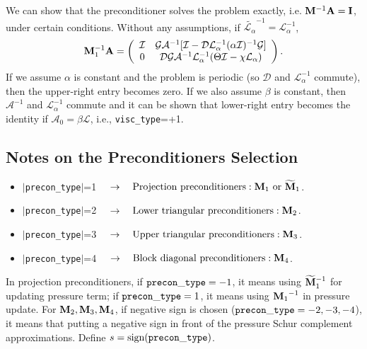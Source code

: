 \documentclass[final]{siamltex}
\def\Ab {{\bf A}}
\def\Ib {{\bf I}}
\def\Mb {{\bf M}}
\begin{document}
We can show that the preconditioner solves the problem exactly, i.e. $\Mb^{-1}\Ab = \Ib$,
under certain conditions.  Without any assumptions, if $\widetilde{\mathcal{L}_\alpha}^{-1}=\mathcal{L}_\alpha^{-1}$,
\begin{equation}
\Mb_1^{-1}\Ab =
\left(\begin{array}{cc}
\mathcal{I} & \mathcal{G}\mathcal{A}^{-1}[\mathcal{I}-\mathcal{D}\mathcal{L}_\alpha^{-1}(\alpha\mathcal{I})^{-1}\mathcal{G}]\\
0 & \mathcal{D}\mathcal{G}\mathcal{A}^{-1}\mathcal{L}_\alpha^{-1}(\Theta\mathcal{I}-\chi\mathcal{L}_\alpha)
\end{array}\right).
\end{equation}
If we assume $\alpha$ is constant and the problem is periodic (so $\mathcal{D}$ 
and $\mathcal{L}_\alpha^{-1}$ commute), then the upper-right entry becomes zero.  If 
we also assume $\beta$ is constant, then $\mathcal{A}^{-1}$ and $\mathcal{L}_\alpha^{-1}$ 
commute and it can be shown that lower-right entry becomes the identity if 
$\mathcal{A}_0=\beta\mathcal{L}$, i.e., {\tt visc\_type}=+1.

\subsection{Notes on the Preconditioners Selection}\label{sec:preconditioners}

\begin{itemize}
\item $|${\tt precon\_type}$|$=1 $\quad\rightarrow\quad \mbox{Projection preconditioners}: {\Mb_1}~\mbox{or}~\widetilde{\Mb}_1$.\\
\item $|${\tt precon\_type}$|$=2 $\quad\rightarrow\quad \mbox{Lower triangular preconditioners}: {\Mb_2}$.\\
\item $|${\tt precon\_type}$|$=3 $\quad\rightarrow\quad \mbox{Upper triangular preconditioners}: {\Mb_3}$.\\
\item $|${\tt precon\_type}$|$=4 $\quad\rightarrow\quad \mbox{Block diagonal preconditioners}: {\Mb_4}$.\\
\end{itemize}
In projection preconditioners, if ${\tt precon\_type}=-1$, it means using $\widetilde{\Mb}_1^{-1}$ for updating pressure term;
if  ${\tt precon\_type}=1$, it means using ${\Mb_1}^{-1}$ in pressure update. For ${\Mb_2}, {\Mb_3}, {\Mb_4}$, if negative sign 
is chosen (${\tt precon\_type}=-2, -3, -4$), it means that putting a negative sign in front of the pressure Schur complement approximations.
Define $s = \mbox{sign} ({\tt precon\_type})$.\\ \\
\end{document}
